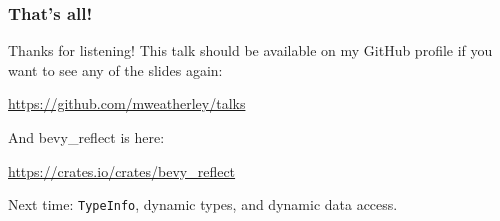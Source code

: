 \documentclass[10pt]{beamer}
\begin{document}
\begin{frame}
    \frametitle{That's all!}
    Thanks for listening! This talk should be available on my GitHub profile if you want to see any of the slides again:
    
    \url{https://github.com/mweatherley/talks}
    
    \vspace{10mm}
    And bevy\_reflect is here:
    
    \url{https://crates.io/crates/bevy_reflect}
    
    \vspace{10mm}
    Next time: \texttt{TypeInfo}, dynamic types, and dynamic data access.
\end{frame}
\end{document}

